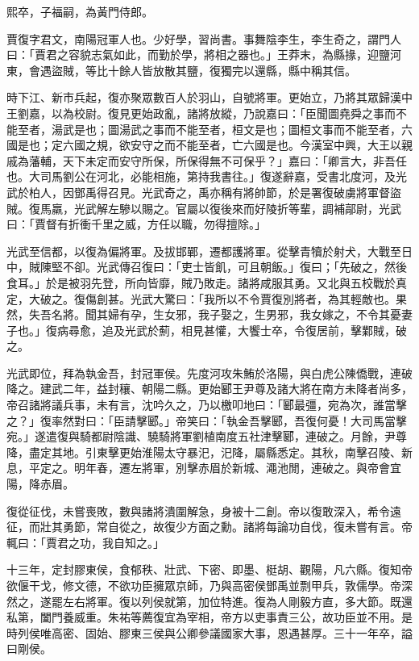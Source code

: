 \begin{pinyinscope}
熙卒，子福嗣，為黃門侍郎。

賈復字君文，南陽冠軍人也。少好學，習尚書。事舞陰李生，李生奇之，謂門人曰：「賈君之容貌志氣如此，而勤於學，將相之器也。」王莽末，為縣掾，迎鹽河東，會遇盜賊，等比十餘人皆放散其鹽，復獨完以還縣，縣中稱其信。

時下江、新市兵起，復亦聚眾數百人於羽山，自號將軍。更始立，乃將其眾歸漢中王劉嘉，以為校尉。復見更始政亂，諸將放縱，乃說嘉曰：「臣聞圖堯舜之事而不能至者，湯武是也；圖湯武之事而不能至者，桓文是也；圖桓文事而不能至者，六國是也；定六國之規，欲安守之而不能至者，亡六國是也。今漢室中興，大王以親戚為藩輔，天下未定而安守所保，所保得無不可保乎？」嘉曰：「卿言大，非吾任也。大司馬劉公在河北，必能相施，第持我書往。」復遂辭嘉，受書北度河，及光武於柏人，因鄧禹得召見。光武奇之，禹亦稱有將帥節，於是署復破虜將軍督盜賊。復馬羸，光武解左驂以賜之。官屬以復後來而好陵折等輩，調補鄗尉，光武曰：「賈督有折衝千里之威，方任以職，勿得擅除。」

光武至信都，以復為偏將軍。及拔邯鄲，遷都護將軍。從擊青犢於射犬，大戰至日中，賊陳堅不卻。光武傳召復曰：「吏士皆飢，可且朝飯。」復曰；「先破之，然後食耳。」於是被羽先登，所向皆靡，賊乃敗走。諸將咸服其勇。又北與五校戰於真定，大破之。復傷創甚。光武大驚曰：「我所以不令賈復別將者，為其輕敵也。果然，失吾名將。聞其婦有孕，生女邪，我子娶之，生男邪，我女嫁之，不令其憂妻子也。」復病尋愈，追及光武於薊，相見甚懽，大饗士卒，令復居前，擊鄴賊，破之。

光武即位，拜為執金吾，封冠軍侯。先度河攻朱鮪於洛陽，與白虎公陳僑戰，連破降之。建武二年，益封穰、朝陽二縣。更始郾王尹尊及諸大將在南方未降者尚多，帝召諸將議兵事，未有言，沈吟久之，乃以檄叩地曰：「郾最彊，宛為次，誰當擊之？」復率然對曰：「臣請擊郾。」帝笑曰：「執金吾擊郾，吾復何憂！大司馬當擊宛。」遂遣復與騎都尉陰識、驍騎將軍劉植南度五社津擊郾，連破之。月餘，尹尊降，盡定其地。引東擊更始淮陽太守暴汜，汜降，屬縣悉定。其秋，南擊召陵、新息，平定之。明年春，遷左將軍，別擊赤眉於新城、澠池閒，連破之。與帝會宜陽，降赤眉。

復從征伐，未嘗喪敗，數與諸將潰圍解急，身被十二創。帝以復敢深入，希令遠征，而壯其勇節，常自從之，故復少方面之勳。諸將每論功自伐，復未嘗有言。帝輒曰：「賈君之功，我自知之。」

十三年，定封膠東侯，食郁秩、壯武、下密、即墨、梃胡、觀陽，凡六縣。復知帝欲偃干戈，修文德，不欲功臣擁眾京師，乃與高密侯鄧禹並剽甲兵，敦儒學。帝深然之，遂罷左右將軍。復以列侯就第，加位特進。復為人剛毅方直，多大節。既還私第，闔門養威重。朱祐等薦復宜為宰相，帝方以吏事責三公，故功臣並不用。是時列侯唯高密、固始、膠東三侯與公卿參議國家大事，恩遇甚厚。三十一年卒，謚曰剛侯。


\end{pinyinscope}
